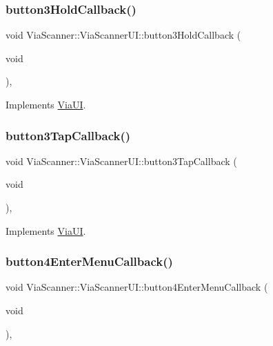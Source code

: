 \subsubsection{\texorpdfstring{button3\+Hold\+Callback()}{button3HoldCallback()}}
{\footnotesize\ttfamily void Via\+Scanner\+::\+Via\+Scanner\+U\+I\+::button3\+Hold\+Callback (\begin{DoxyParamCaption}\item[{void}]{ }\end{DoxyParamCaption})\hspace{0.3cm}{\ttfamily [override]}, {\ttfamily [virtual]}}



Implements \mbox{\hyperlink{class_via_u_i_a7334aea36cf78afac284dd5e899e8ace}{Via\+UI}}.

\mbox{\label{class_via_scanner_1_1_via_scanner_u_i_ac4c5b6ba60ade672ebe768c9d4849d62}} 
\subsubsection{\texorpdfstring{button3\+Tap\+Callback()}{button3TapCallback()}}
{\footnotesize\ttfamily void Via\+Scanner\+::\+Via\+Scanner\+U\+I\+::button3\+Tap\+Callback (\begin{DoxyParamCaption}\item[{void}]{ }\end{DoxyParamCaption})\hspace{0.3cm}{\ttfamily [override]}, {\ttfamily [virtual]}}



Implements \mbox{\hyperlink{class_via_u_i_a3dfd40d901aaa8c8310bdbf75f4432a5}{Via\+UI}}.

\mbox{\label{class_via_scanner_1_1_via_scanner_u_i_a45b4492b06d3b834c4934ace2d7d15aa}} 
\subsubsection{\texorpdfstring{button4\+Enter\+Menu\+Callback()}{button4EnterMenuCallback()}}
{\footnotesize\ttfamily void Via\+Scanner\+::\+Via\+Scanner\+U\+I\+::button4\+Enter\+Menu\+Callback (\begin{DoxyParamCaption}\item[{void}]{ }\end{DoxyParamCaption})\hspace{0.3cm}{\ttfamily [override]}, {\ttfamily [virtual]}}



